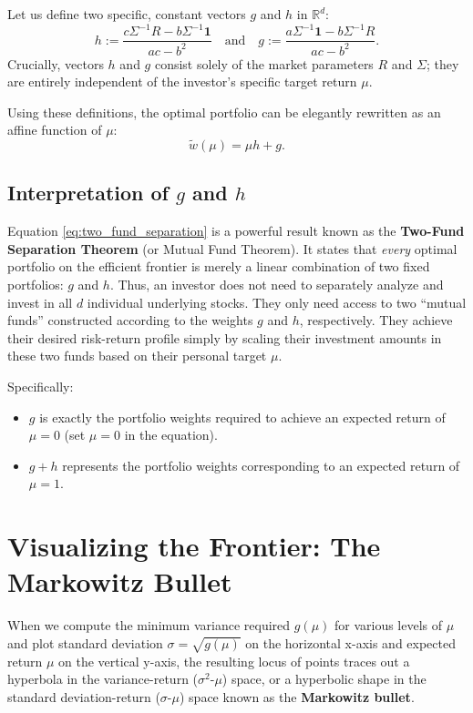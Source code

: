 Let us define two specific, constant vectors $g$ and $h$ in $\mathbb{R}^d$:
\begin{equation}
    h := \frac{c \Sigma^{-1} R - b \Sigma^{-1} \mathbf{1}}{ac - b^2} \quad \text{and} \quad g := \frac{a \Sigma^{-1} \mathbf{1} - b \Sigma^{-1} R}{ac - b^2}.
\end{equation}
Crucially, vectors $h$ and $g$ consist solely of the market parameters $R$ and $\Sigma$; they are entirely independent of the investor's specific target return $\mu$.

Using these definitions, the optimal portfolio can be elegantly rewritten as an affine function of $\mu$:
\begin{equation}
    \tilde{w}(\mu) = \mu h + g. \label{eq:two_fund_separation}
\end{equation}

\subsection{Interpretation of $g$ and $h$}
Equation \eqref{eq:two_fund_separation} is a powerful result known as the \textbf{Two-Fund Separation Theorem} (or Mutual Fund Theorem).
It states that \textit{every} optimal portfolio on the efficient frontier is merely a linear combination of two fixed portfolios: $g$ and $h$. Thus, an investor does not need to separately analyze and invest in all $d$ individual underlying stocks. They only need access to two ``mutual funds'' constructed according to the weights $g$ and $h$, respectively. They achieve their desired risk-return profile simply by scaling their investment amounts in these two funds based on their personal target $\mu$.

Specifically:
\begin{itemize}
    \item $g$ is exactly the portfolio weights required to achieve an expected return of $\mu = 0$ (set $\mu=0$ in the equation).
    \item $g+h$ represents the portfolio weights corresponding to an expected return of $\mu = 1$.
\end{itemize}

\section{Visualizing the Frontier: The Markowitz Bullet}

When we compute the minimum variance required $g(\mu)$ for various levels of $\mu$ and plot standard deviation $\sigma = \sqrt{g(\mu)}$ on the horizontal x-axis and expected return $\mu$ on the vertical y-axis, the resulting locus of points traces out a hyperbola in the variance-return ($\sigma^2$-$\mu$) space, or a hyperbolic shape in the standard deviation-return ($\sigma$-$\mu$) space known as the \textbf{Markowitz bullet}.

